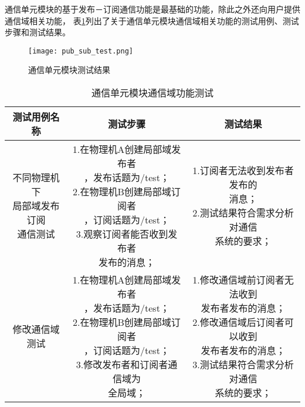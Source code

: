 通信单元模块的基于发布－订阅通信功能是最基础的功能，除此之外还向用户提供通信域相关功能，
表\ref{communication_unit_communication_domain}列出了关于通信单元模块通信域相关功能的测试用例、测试步骤和测试结果。

\begin{figure}[H]
  \centering
  \texttt{[image: pub\_sub\_test.png]}
  \caption{通信单元模块测试结果}
  \label{pub_sub_test}
\end{figure}

\begin{table}[H]
  \centering\small
  \caption{通信单元模块通信域功能测试}
  \renewcommand\arraystretch{1.2}
  \label{communication_unit_communication_domain}
  \begin{tabular}{ccc}
    \toprule
    测试用例名称 & 测试步骤 & 测试结果 \\
    \midrule
    \makecell[l]{不同物理机下\\局部域发布订阅\\通信测试}& \makecell[l]{1.在物理机A创建局部域发布者\\，发布话题为/test；\\2.在物理机B创建局部域订阅者\\，订阅话题为/test；\\3.观察订阅者能否收到发布者\\发布的消息；} & \makecell[l]{1.订阅者无法收到发布者发布的\\消息；\\2.测试结果符合需求分析对通信\\系统的要求；}\\
    \hline
    修改通信域测试 & \makecell[l]{1.在物理机A创建局部域发布者\\，发布话题为/test；\\2.在物理机B创建局部域订阅者\\，订阅话题为/test；\\3.修改发布者和订阅者通信域为\\全局域；} & \makecell[l]{1.修改通信域前订阅者无法收到\\发布者发布的消息；\\2.修改通信域后订阅者可以收到\\发布者发布的消息；\\3.测试结果符合需求分析对通信\\系统的要求；} \\
    \bottomrule
  \end{tabular}
\end{table}

